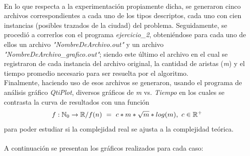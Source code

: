\paragraph{}
En lo que respecta a la experimentación propiamente dicha, se generaron cinco archivos correspondientes a cada uno de los tipos descriptos, cada uno con cien instancias (posibles trazados de la ciudad) del problema. Seguidamente, se procedió a correrlos con el programa \textit{ejercicio\_2},  obteniéndose para cada uno de ellos un archivo \textit{"NombreDeArchivo.out"} y un archivo \textit{"NombreDeArchivo\_grafico.out"}; siendo este último el archivo en el cual se registraron de cada instancia del archivo original, la cantidad de aristas (\textit{m}) y el tiempo promedio necesario para ser resuelta por el algoritmo. \\
Finalmente, haciendo uso de esos archivos se generaron, usando el programa de análisis gráfico \textit{QtiPlot}, diversos gráficos de \textit{m} vs. \textit{Tiempo} en los cuales se contrasta la curva de resultados con una función 
	$$f: \mathbb{N}_0 \rightarrow \mathbb{R} / f(n)\ =\ c * m * \sqrt{m} * log(m),\ c \in \mathbb{R}^+$$
para poder estudiar si la complejidad real se ajusta a la complejidad teórica.

\paragraph{}
A continuación se presentan los gráficos realizados para cada caso:

